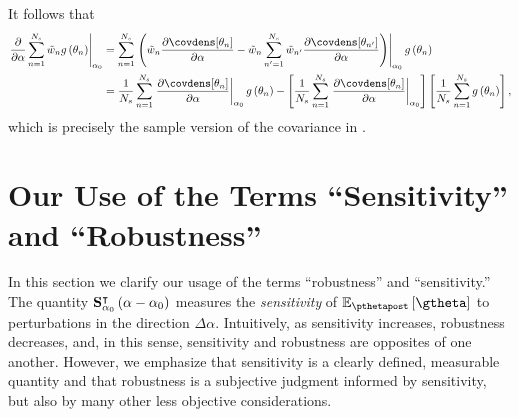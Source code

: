 \documentclass{article}\usepackage[]{graphicx}\usepackage[]{color}
\theoremstyle{definition}
\theoremstyle{plain}
\theoremstyle{plain}
\theoremstyle{plain}
\theoremstyle{definition}
\theoremstyle{plain}
\theoremstyle{plain}
\begin{document}
It follows that
\begin{align*}
\left.\frac{\partial}{\partial\alpha}
    \sum_{n=1}^{N_s}\tilde{w}_{n}g\left(\theta_{n}\right)\right|_{\alpha_{0}} &
    =\sum_{n=1}^{N_s}\left.\left(\tilde{w}_{n}\frac{\partial\covdens[\theta_{n}]}
    {\partial\alpha}-
    \tilde{w}_{n}\sum_{n'=1}^{N_s}\tilde{w}_{n'}
    \frac{\partial\covdens[\theta_{n'}]}{\partial\alpha}\right)
    \right|_{\alpha_{0}}g\left(\theta_{n}\right)\\
 & =\frac{1}{N_s}\sum_{n=1}^{N_s}
    \left.\frac{\partial\covdens[\theta_{n}]}{\partial\alpha}\right|_{\alpha_{0}}
    g\left(\theta_{n}\right)
    - \left[ \frac{1}{N_s}\sum_{n=1}^{N_s}\left.
    \frac{\partial\covdens[\theta_{n}]}{\partial\alpha}\right|_{\alpha_{0}} \right]
    \left[ \frac{1}{N_s}\sum_{n=1}^{N_s}g\left(\theta_{n}\right) \right],
\end{align*}
which is precisely the sample version of the covariance in
.

\section{Our Use of the Terms ``Sensitivity'' and ``Robustness''\label{app:sens_and_robustness}}

In this section we clarify our usage of the terms ``robustness''
and ``sensitivity.'' The quantity $\mathbf{S}_{\alpha_{0}}^{\intercal}\left(\alpha-\alpha_{0}\right)$
measures the \emph{sensitivity} of $\epgtheta$ to perturbations in
the direction $\Delta\alpha$. Intuitively, as sensitivity increases,
robustness decreases, and, in this sense, sensitivity and robustness
are opposites of one another. However, we emphasize that sensitivity
is a clearly defined, measurable quantity and that robustness is a
subjective judgment informed by sensitivity, but also by many other
less objective considerations.
\end{document}
